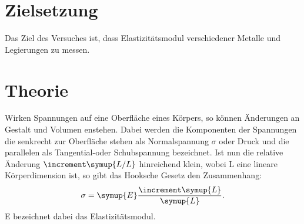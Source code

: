 
\section{Zielsetzung}
Das Ziel des Versuches ist, dass Elastizitätsmodul verschiedener Metalle und
Legierungen zu messen. %
\section{Theorie}
\label{sec:Theorie}
Wirken Spannungen auf eine Oberfläche eines Körpers, so können Änderungen an
Gestalt und Volumen enstehen. Dabei werden die Komponenten der Spannungen die
senkrecht zur Oberfläche stehen als Normalspannung $\sigma$ oder Druck und die
parallelen als Tangential-oder Schubspannung bezeichnet. Ist nun die relative
Änderung $ \increment \symup{L /L} $ hinreichend klein, wobei L eine lineare Körperdimension
ist, so gibt das Hooksche Gesetz den Zusammenhang:
\begin{equation}
  \sigma = \symup{E}\frac{\increment \symup{L}}{\symup{L}}.
  \label{eqn:hook}
\end{equation}
E bezeichnet dabei das Elastizitätsmodul.

